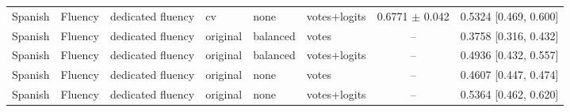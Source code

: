 \begin{tabular}{llllllcc}
Spanish & Fluency & dedicated fluency & cv & none & votes+logits & 0.6771 $\pm$ 0.042 & 0.5324 [0.469, 0.600] \\
Spanish & Fluency & dedicated fluency & original & balanced & votes & -- & 0.3758 [0.316, 0.432] \\
Spanish & Fluency & dedicated fluency & original & balanced & votes+logits & -- & 0.4936 [0.432, 0.557] \\
Spanish & Fluency & dedicated fluency & original & none & votes & -- & 0.4607 [0.447, 0.474] \\
Spanish & Fluency & dedicated fluency & original & none & votes+logits & -- & 0.5364 [0.462, 0.620] \\
\hline
\end{tabular}
